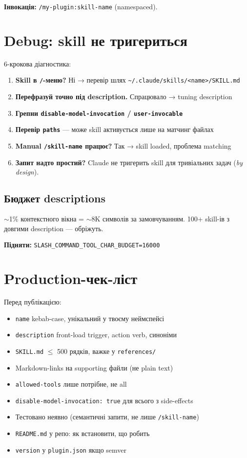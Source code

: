 \documentclass[11pt,a4paper]{article}
\begin{document}
\textbf{Інвокація:} \texttt{/my-plugin:skill-name} (namespaced).

\section{Debug: skill не тригериться}

6-крокова діагностика:

\begin{enumerate}
\item \textbf{Skill в \texttt{/}-меню?} Ні → перевір шлях \texttt{\textasciitilde/.claude/skills/<name>/SKILL.md}
\item \textbf{Перефразуй точно під description.} Спрацювало → tuning description
\item \textbf{Грепни \texttt{disable-model-invocation} / \texttt{user-invocable}}
\item \textbf{Перевір \texttt{paths}} — може skill активується лише на матчинг файлах
\item \textbf{Manual \texttt{/skill-name} працює?} Так → skill loaded, проблема matching
\item \textbf{Запит надто простий?} Claude не тригерить skill для тривіальних задач (\textit{by design}).
\end{enumerate}

\subsection{Бюджет descriptions}

$\sim$1\% контекстного вікна = $\sim$8K символів за замовчуванням. 100+ skill-ів з довгими description --- обріжуть.

\textbf{Підняти:} \texttt{SLASH\_COMMAND\_TOOL\_CHAR\_BUDGET=16000}

\section{Production-чек-ліст}

Перед публікацією:

\begin{itemize}[leftmargin=2em]
\item[$\square$] \texttt{name} kebab-case, унікальний у твоєму неймспейсі
\item[$\square$] \texttt{description} front-load trigger, action verb, синоніми
\item[$\square$] \texttt{SKILL.md} $\le$ 500 рядків, важке у \texttt{references/}
\item[$\square$] Markdown-links на supporting файли (не plain text)
\item[$\square$] \texttt{allowed-tools} лише потрібне, не all
\item[$\square$] \texttt{disable-model-invocation: true} для всього з side-effects
\item[$\square$] Тестовано неявно (семантичні запити, не лише \texttt{/skill-name})
\item[$\square$] \texttt{README.md} у репо: як встановити, що робить
\item[$\square$] \texttt{version} у \texttt{plugin.json} якщо semver
\end{itemize}
\end{document}

